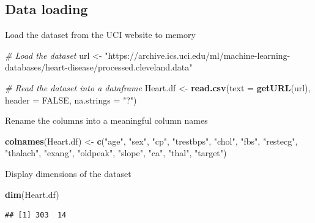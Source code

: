 \documentclass[
]{article}
\newenvironment{Shaded}{\begin{snugshade}}{\end{snugshade}}
\newcommand{\AttributeTok}[1]{\textcolor[rgb]{0.13,0.29,0.53}{#1}}
\newcommand{\CommentTok}[1]{\textcolor[rgb]{0.56,0.35,0.01}{\textit{#1}}}
\newcommand{\ConstantTok}[1]{\textcolor[rgb]{0.56,0.35,0.01}{#1}}
\newcommand{\FunctionTok}[1]{\textcolor[rgb]{0.13,0.29,0.53}{\textbf{#1}}}
\newcommand{\NormalTok}[1]{#1}
\newcommand{\OtherTok}[1]{\textcolor[rgb]{0.56,0.35,0.01}{#1}}
\newcommand{\StringTok}[1]{\textcolor[rgb]{0.31,0.60,0.02}{#1}}
\begin{document}
\subsection{Data loading}\label{data-loading}

Load the dataset from the UCI website to memory

\begin{Shaded}
\begin{Highlighting}[]
\CommentTok{\# Load the dataset}
\NormalTok{url }\OtherTok{\textless{}{-}} \StringTok{"https://archive.ics.uci.edu/ml/machine{-}learning{-}databases/heart{-}disease/processed.cleveland.data"}

\CommentTok{\# Read the dataset into a dataframe}
\NormalTok{Heart.df }\OtherTok{\textless{}{-}} \FunctionTok{read.csv}\NormalTok{(}\AttributeTok{text =} \FunctionTok{getURL}\NormalTok{(url), }\AttributeTok{header =} \ConstantTok{FALSE}\NormalTok{, }\AttributeTok{na.strings =} \StringTok{"?"}\NormalTok{)}
\end{Highlighting}
\end{Shaded}

Rename the columns into a meaningful column names

\begin{Shaded}
\begin{Highlighting}[]
\FunctionTok{colnames}\NormalTok{(Heart.df) }\OtherTok{\textless{}{-}} \FunctionTok{c}\NormalTok{(}\StringTok{"age"}\NormalTok{, }\StringTok{"sex"}\NormalTok{, }\StringTok{"cp"}\NormalTok{, }\StringTok{"trestbps"}\NormalTok{, }\StringTok{"chol"}\NormalTok{, }\StringTok{"fbs"}\NormalTok{,}
                        \StringTok{"restecg"}\NormalTok{, }\StringTok{"thalach"}\NormalTok{, }\StringTok{"exang"}\NormalTok{, }\StringTok{"oldpeak"}\NormalTok{, }
                        \StringTok{"slope"}\NormalTok{, }\StringTok{"ca"}\NormalTok{, }\StringTok{"thal"}\NormalTok{, }\StringTok{"target"}\NormalTok{)}
\end{Highlighting}
\end{Shaded}

Display dimensions of the dataset

\begin{Shaded}
\begin{Highlighting}[]
\FunctionTok{dim}\NormalTok{(Heart.df)}
\end{Highlighting}
\end{Shaded}

\begin{verbatim}
## [1] 303  14
\end{verbatim}
\end{document}
